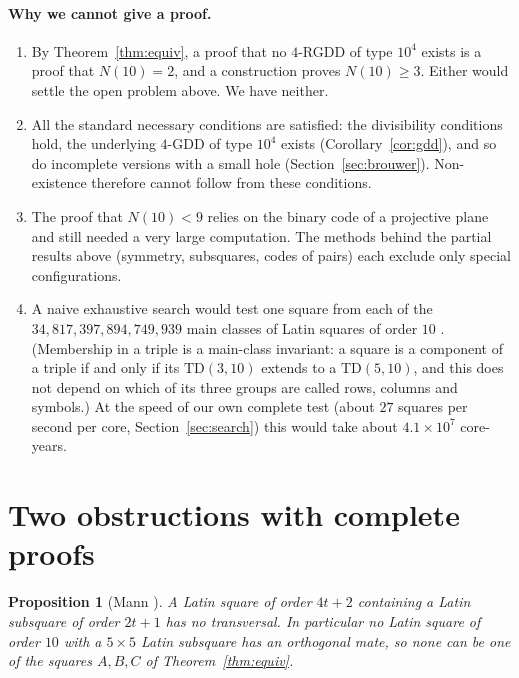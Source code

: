 \documentclass[11pt]{article}
\newtheorem{proposition}[theorem]{Proposition}
\theoremstyle{remark}
\newcommand{\TD}{\mathrm{TD}}
\begin{document}
\paragraph{Why we cannot give a proof.}
\begin{enumerate}
\item By Theorem~\ref{thm:equiv}, a proof that no $4$-RGDD of type $10^{4}$ exists is a
  proof that $N(10)=2$, and a construction proves $N(10)\ge 3$.  Either would settle the
  open problem above.  We have neither.
\item All the standard necessary conditions are satisfied: the divisibility conditions
  hold, the underlying $4$-GDD of type $10^{4}$ exists (Corollary~\ref{cor:gdd}), and so
  do incomplete versions with a small hole (Section~\ref{sec:brouwer}).  Non-existence
  therefore cannot follow from these conditions.
\item The proof that $N(10)<9$ \cite{LTS89} relies on the binary code of a projective
  plane and still needed a very large computation.  The methods behind the partial
  results above (symmetry, subsquares, codes of pairs) each exclude only special
  configurations.
\item A naive exhaustive search would test one square from each of the
  $34{,}817{,}397{,}894{,}749{,}939$ main classes of Latin squares of order $10$
  \cite{MMM07}.  (Membership in a triple is a main-class invariant: a square is a
  component of a triple if and only if its $\TD(3,10)$ extends to a $\TD(5,10)$, and this
  does not depend on which of its three groups are called rows, columns and symbols.)
  At the speed of our own complete test (about $27$ squares per second per core,
  Section~\ref{sec:search}) this would take about $4.1\times 10^{7}$ core-years.
\end{enumerate}

\section{Two obstructions with complete proofs}\label{sec:obstr}

\begin{proposition}[Mann \cite{Man44}]\label{prop:mann}
A Latin square of order $4t+2$ containing a Latin subsquare of order $2t+1$ has no
transversal.  In particular no Latin square of order $10$ with a $5\times 5$ Latin
subsquare has an orthogonal mate, so none can be one of the squares $A,B,C$ of
Theorem~\ref{thm:equiv}.
\end{proposition}
\end{document}
